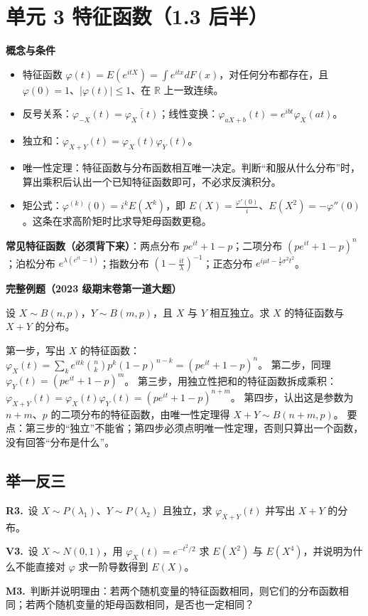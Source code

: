 \documentclass[UTF8,a4paper,11pt]{ctexart}
\newcommand{\CompactQuestion}[2]{\par\noindent\textbf{#1.}\ #2\par\vspace{.8em}}
\begin{document}
\section{单元 3 特征函数（1.3 后半）}
\textbf{概念与条件}

\begin{itemize}
\item 特征函数 $\varphi(t)=E(e^{itX})=\int e^{itx}dF(x)$，对任何分布都存在，且 $\varphi(0)=1$、$|\varphi(t)|\le 1$、在 $\mathbb{R}$ 上一致连续。
\item 反号关系：$\varphi_{-X}(t)=\overline{\varphi_X(t)}$；线性变换：$\varphi_{aX+b}(t)=e^{ibt}\varphi_X(at)$。
\item 独立和：$\varphi_{X+Y}(t)=\varphi_X(t)\varphi_Y(t)$。
\item 唯一性定理：特征函数与分布函数相互唯一决定。判断“和服从什么分布”时，算出乘积后认出一个已知特征函数即可，不必求反演积分。
\item 矩公式：$\varphi^{(k)}(0)=i^kE(X^k)$，即 $E(X)=\frac{\varphi'(0)}{i}$、$E(X^2)=-\varphi''(0)$。这条在求高阶矩时比求导矩母函数更稳。
\end{itemize}
\textbf{常见特征函数（必须背下来）}：两点分布 $pe^{it}+1-p$；二项分布 $(pe^{it}+1-p)^n$；泊松分布 $e^{\lambda(e^{it}-1)}$；指数分布 $\left(1-\frac{it}{\lambda}\right)^{-1}$；正态分布 $e^{i\mu t-\frac12\sigma^2t^2}$。

\textbf{完整例题（2023 级期末卷第一道大题）}

设 $X\sim B(n,p)$，$Y\sim B(m,p)$，且 $X$ 与 $Y$ 相互独立。求 $X$ 的特征函数与 $X+Y$ 的分布。

第一步，写出 $X$ 的特征函数：$\varphi_X(t)=\sum_k e^{itk}\binom{n}{k}p^k(1-p)^{n-k}=(pe^{it}+1-p)^n$。 第二步，同理 $\varphi_Y(t)=(pe^{it}+1-p)^m$。 第三步，用独立性把和的特征函数拆成乘积：$\varphi_{X+Y}(t)=\varphi_X(t)\varphi_Y(t)=(pe^{it}+1-p)^{n+m}$。 第四步，认出这是参数为 $n+m$、$p$ 的二项分布的特征函数，由唯一性定理得 $X+Y\sim B(n+m,p)$。 要点：第三步的“独立”不能省；第四步必须点明唯一性定理，否则只算出一个函数，没有回答“分布是什么”。

\subsection{举一反三}
\CompactQuestion{R3}{设 $X\sim P(\lambda_1)$、$Y\sim P(\lambda_2)$ 且独立，求 $\varphi_{X+Y}(t)$ 并写出 $X+Y$ 的分布。}
\CompactQuestion{V3}{设 $X\sim N(0,1)$，用 $\varphi_X(t)=e^{-t^2/2}$ 求 $E(X^2)$ 与 $E(X^4)$，并说明为什么不能直接对 $\varphi$ 求一阶导数得到 $E(X)$。}
\CompactQuestion{M3}{判断并说明理由：若两个随机变量的特征函数相同，则它们的分布函数相同；若两个随机变量的矩母函数相同，是否也一定相同？}
\clearpage
{}
\end{document}
